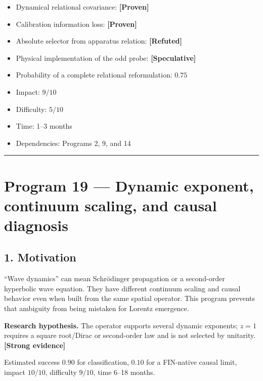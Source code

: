 \documentclass[11pt,a4paper,openany]{report}
\newcommand{\statusProven}{\textcolor{fingreen}{[Proven]}}
\newcommand{\statusStrong}{\textcolor{finblue}{[Strong evidence]}}
\newcommand{\statusSpeculative}{\textcolor{finorange}{[Speculative]}}
\newcommand{\statusRefuted}{\textcolor{finred}{[Refuted]}}
\begin{document}
\begin{itemize}
\item 
Dynamical relational covariance: \textbf{\statusProven{}}

\item 
Calibration information loss: \textbf{\statusProven{}}

\item 
Absolute selector from apparatus relation: \textbf{\statusRefuted{}}

\item 
Physical implementation of the odd probe: \textbf{\statusSpeculative{}}

\item 
Probability of a complete relational reformulation: \(0.75\)

\item 
Impact: \(9/10\)

\item 
Difficulty: \(5/10\)

\item 
Time: 1–3 months

\item 
Dependencies: Programs 2, 9, and 14

\end{itemize}

\par\medskip\hrule\medskip

\chapter{Program 19 — Dynamic exponent, continuum scaling, and causal diagnosis}

\section{1. Motivation}

“Wave dynamics” can mean Schrödinger propagation or a second-order hyperbolic wave equation. They have different continuum scaling and causal behavior even when built from the same spatial operator. This program prevents that ambiguity from being mistaken for Lorentz emergence.

\textbf{Research hypothesis.} The operator supports several dynamic exponents; \(z=1\) requires a square root/\allowbreak{}Dirac or second-order law and is not selected by unitarity. \textbf{\statusStrong{}}

Estimated success \(0.90\) for classification, \(0.10\) for a FIN-native causal limit, impact \(10/10\), difficulty \(9/10\), time 6–18 months.
\end{document}
